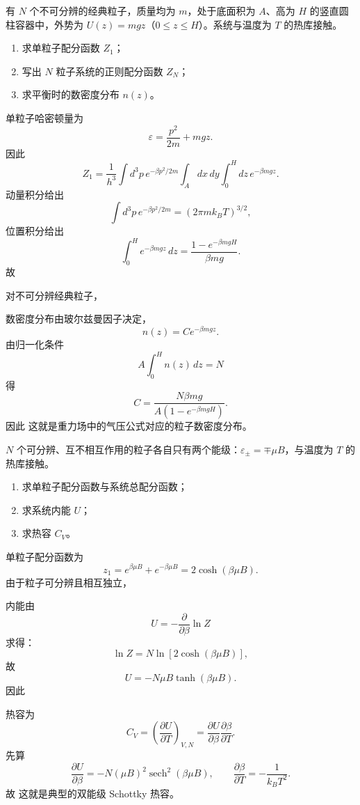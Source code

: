 \begin{question}
有 $N$ 个不可分辨的经典粒子，质量均为 $m$，处于底面积为 $A$、高为 $H$ 的竖直圆柱容器中，外势为 $U(z)=mgz$（$0\le z\le H$）。系统与温度为 $T$ 的热库接触。

\begin{enumerate}[label=(\arabic*),leftmargin=2.5em]
  \item 求单粒子配分函数 $Z_1$；
  \item 写出 $N$ 粒子系统的正则配分函数 $Z_N$；
  \item 求平衡时的数密度分布 $n(z)$。
\end{enumerate}

\begin{solution}
单粒子哈密顿量为
\[
\varepsilon=\frac{p^2}{2m}+mgz.
\]
因此
\[
Z_1=\frac{1}{h^3}\int d^3p\,e^{-\beta p^2/2m}\int_A dx\,dy\int_0^H dz\,e^{-\beta mgz}.
\]
动量积分给出
\[
\int d^3p\,e^{-\beta p^2/2m}=(2\pi m k_B T)^{3/2},
\]
位置积分给出
\[
\int_0^H e^{-\beta mgz}\,dz=\frac{1-e^{-\beta mgH}}{\beta mg}.
\]
故

对不可分辨经典粒子，

数密度分布由玻尔兹曼因子决定，
\[
n(z)=C e^{-\beta mgz}.
\]
由归一化条件
\[
A\int_0^H n(z)\,dz=N
\]
得
\[
C=\frac{N\beta mg}{A(1-e^{-\beta mgH})}.
\]
因此
这就是重力场中的气压公式对应的粒子数密度分布。
\end{solution}
\end{question}
\begin{question}
$N$ 个可分辨、互不相互作用的粒子各自只有两个能级：$\varepsilon_{\pm}=\mp \mu B$，与温度为 $T$ 的热库接触。

\begin{enumerate}[label=(\arabic*),leftmargin=2.5em]
  \item 求单粒子配分函数与系统总配分函数；
  \item 求系统内能 $U$；
  \item 求热容 $C_V$。
\end{enumerate}

\begin{solution}
单粒子配分函数为
\[
z_1=e^{\beta \mu B}+e^{-\beta \mu B}=2\cosh(\beta\mu B).
\]
由于粒子可分辨且相互独立，

内能由
\[
U=-\frac{\partial}{\partial\beta}\ln Z
\]
求得：
\[
\ln Z=N\ln[2\cosh(\beta\mu B)],
\]
故
\[
U=-N\mu B\tanh(\beta\mu B).
\]
因此

热容为
\[
C_V=\left(\frac{\partial U}{\partial T}\right)_{V,N}
=
\frac{\partial U}{\partial \beta}\frac{\partial \beta}{\partial T}.
\]
先算
\[
\frac{\partial U}{\partial\beta}
=-N(\mu B)^2\operatorname{sech}^2(\beta\mu B),
\qquad
\frac{\partial\beta}{\partial T}=-\frac{1}{k_B T^2}.
\]
故
这就是典型的双能级 Schottky 热容。
\end{solution}
\end{question}
